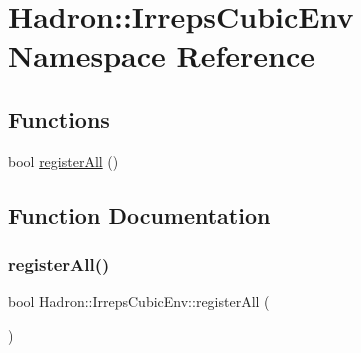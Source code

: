 \hypertarget{namespaceHadron_1_1IrrepsCubicEnv}{}\section{Hadron\+:\+:Irreps\+Cubic\+Env Namespace Reference}
\label{namespaceHadron_1_1IrrepsCubicEnv}
\subsection*{Functions}
\begin{DoxyCompactItemize}
\item 
bool \mbox{\hyperlink{namespaceHadron_1_1IrrepsCubicEnv_a180ad30fa93d4d682cf36167092198ba}{register\+All}} ()
\end{DoxyCompactItemize}


\subsection{Function Documentation}
\mbox{\label{namespaceHadron_1_1IrrepsCubicEnv_a180ad30fa93d4d682cf36167092198ba}} 
\subsubsection{\texorpdfstring{registerAll()}{registerAll()}}
{\footnotesize\ttfamily bool Hadron\+::\+Irreps\+Cubic\+Env\+::register\+All (\begin{DoxyParamCaption}{ }\end{DoxyParamCaption})}

